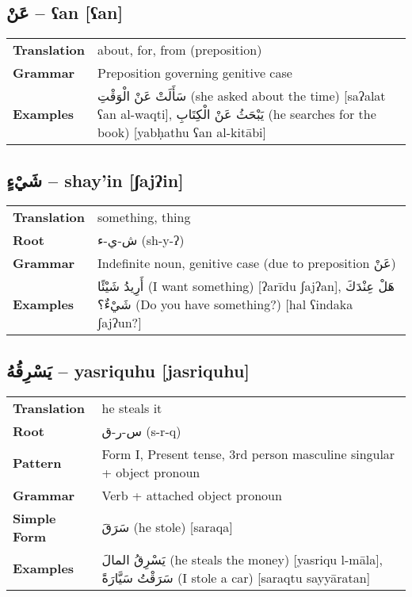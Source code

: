 \documentclass[a4paper,12pt]{article}
\begin{document}
\subsection{\textarabic{عَنْ} – \textbf{ʕan} [ʕan]}
\begin{tabular}{p{3cm}p{10cm}}
\toprule
\textbf{Translation} & about, for, from (preposition) \\
\textbf{Grammar} & Preposition governing genitive case \\
\textbf{Examples} & \textarabic{سَأَلَتْ عَنْ الْوَقْتِ} (she asked about the time) [saʔalat ʕan al-waqti], \textarabic{يَبْحَثُ عَنْ الْكِتَابِ} (he searches for the book) [yabḥathu ʕan al-kitābi] \\
\bottomrule
\end{tabular}

\subsection{\textarabic{شَيْءٍ} – \textbf{shay'in} [ʃajʔin]}
\begin{tabular}{p{3cm}p{10cm}}
\toprule
\textbf{Translation} & something, thing \\
\textbf{Root} & \textarabic{ش-ي-ء} (sh-y-ʔ) \\
\textbf{Grammar} & Indefinite noun, genitive case (due to preposition \textarabic{عَنْ}) \\
\textbf{Examples} & \textarabic{أَرِيدُ شَيْئًا} (I want something) [ʔarīdu ʃajʔan], \textarabic{هَلْ عِنْدَكَ شَيْءٌ؟} (Do you have something?) [hal ʕindaka ʃajʔun?] \\
\bottomrule
\end{tabular}

\subsection{\textarabic{يَسْرِقُهُ} – \textbf{yasriquhu} [jasriquhu]}
\begin{tabular}{p{3cm}p{10cm}}
\toprule
\textbf{Translation} & he steals it \\
\textbf{Root} & \textarabic{س-ر-ق} (s-r-q) \\
\textbf{Pattern} & Form I, Present tense, 3rd person masculine singular + object pronoun \\
\textbf{Grammar} & Verb + attached object pronoun \\
\textbf{Simple Form} & \textarabic{سَرَقَ} (he stole) [saraqa] \\
\textbf{Examples} & \textarabic{يَسْرِقُ المالَ} (he steals the money) [yasriqu l-māla], \textarabic{سَرَقْتُ سَيَّارَةً} (I stole a car) [saraqtu sayyāratan] \\
\bottomrule
\end{tabular}
\end{document}
